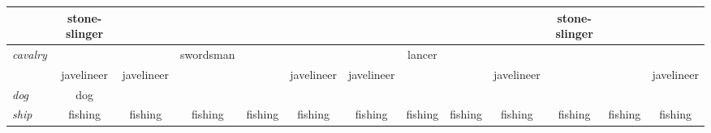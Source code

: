 \documentclass{article}
\begin{document}
\begin{landscape}
\begin{tabular}{l||c|c|c|c||c|c|c|c||c|c|c|c}
 & stone-slinger  &                &                &                &                &                &                &                &                & stone-slinger  &                &                \\
\hline\textit{cavalry}
 &                &                & swordsman      &                &                &                & lancer         &                &                &                &                &                \\
 & javelineer     & javelineer     &                &                & javelineer     & javelineer     &                &                & javelineer     &                &                & javelineer     \\
\hline\textit{dog}
 & dog            &                &                &                &                &                &                &                &                &                &                &                \\
\hline\textit{ship}
 & fishing        & fishing        & fishing        & fishing        & fishing        & fishing        & fishing        & fishing        & fishing        & fishing        & fishing        & fishing        \\


\end{tabular}
\end{landscape}
\end{document}
